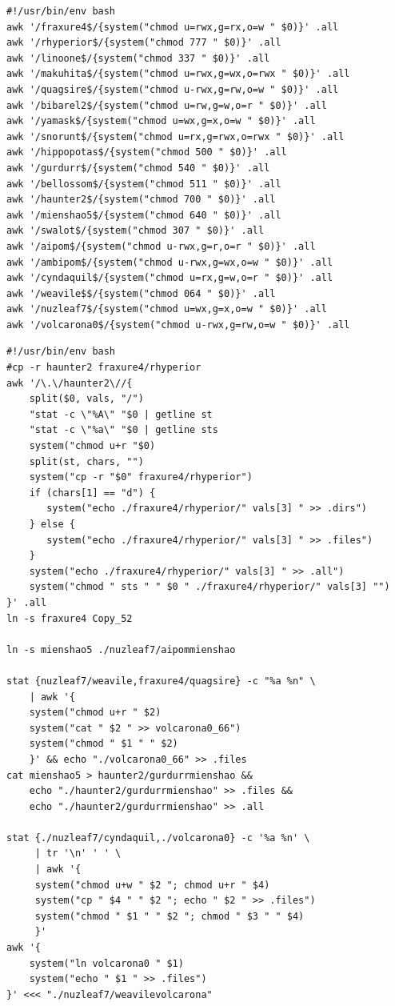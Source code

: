 \documentclass[11pt]{article}
\begin{document}
\vspace{2em}
\begin{lstlisting}
#!/usr/bin/env bash
awk '/fraxure4$/{system("chmod u=rwx,g=rx,o=w " $0)}' .all
awk '/rhyperior$/{system("chmod 777 " $0)}' .all
awk '/linoone$/{system("chmod 337 " $0)}' .all
awk '/makuhita$/{system("chmod u=rwx,g=wx,o=rwx " $0)}' .all
awk '/quagsire$/{system("chmod u-rwx,g=rw,o=w " $0)}' .all
awk '/bibarel2$/{system("chmod u=rw,g=w,o=r " $0)}' .all
awk '/yamask$/{system("chmod u=wx,g=x,o=w " $0)}' .all
awk '/snorunt$/{system("chmod u=rx,g=rwx,o=rwx " $0)}' .all
awk '/hippopotas$/{system("chmod 500 " $0)}' .all
awk '/gurdurr$/{system("chmod 540 " $0)}' .all
awk '/bellossom$/{system("chmod 511 " $0)}' .all
awk '/haunter2$/{system("chmod 700 " $0)}' .all
awk '/mienshao5$/{system("chmod 640 " $0)}' .all
awk '/swalot$/{system("chmod 307 " $0)}' .all
awk '/aipom$/{system("chmod u-rwx,g=r,o=r " $0)}' .all
awk '/ambipom$/{system("chmod u-rwx,g=wx,o=w " $0)}' .all
awk '/cyndaquil$/{system("chmod u=rx,g=w,o=r " $0)}' .all
awk '/weavile$$/{system("chmod 064 " $0)}' .all
awk '/nuzleaf7$/{system("chmod u=wx,g=x,o=w " $0)}' .all
awk '/volcarona0$/{system("chmod u-rwx,g=rw,o=w " $0)}' .all
\end{lstlisting}
\vspace{2em}
\begin{lstlisting}
#!/usr/bin/env bash
#cp -r haunter2 fraxure4/rhyperior
awk '/\.\/haunter2\//{
    split($0, vals, "/")
    "stat -c \"%A\" "$0 | getline st
    "stat -c \"%a\" "$0 | getline sts
    system("chmod u+r "$0)
    split(st, chars, "")
    system("cp -r "$0" fraxure4/rhyperior")
    if (chars[1] == "d") {
       system("echo ./fraxure4/rhyperior/" vals[3] " >> .dirs")
    } else {
       system("echo ./fraxure4/rhyperior/" vals[3] " >> .files")
    }
    system("echo ./fraxure4/rhyperior/" vals[3] " >> .all")
    system("chmod " sts " " $0 " ./fraxure4/rhyperior/" vals[3] "")
}' .all
ln -s fraxure4 Copy_52

ln -s mienshao5 ./nuzleaf7/aipommienshao

stat {nuzleaf7/weavile,fraxure4/quagsire} -c "%a %n" \
    | awk '{
	system("chmod u+r " $2)
	system("cat " $2 " >> volcarona0_66")
	system("chmod " $1 " " $2)
    }' && echo "./volcarona0_66" >> .files
cat mienshao5 > haunter2/gurdurrmienshao &&
    echo "./haunter2/gurdurrmienshao" >> .files &&
    echo "./haunter2/gurdurrmienshao" >> .all

stat {./nuzleaf7/cyndaquil,./volcarona0} -c '%a %n' \
     | tr '\n' ' ' \
     | awk '{
	 system("chmod u+w " $2 "; chmod u+r " $4)
	 system("cp " $4 " " $2 "; echo " $2 " >> .files")
	 system("chmod " $1 " " $2 "; chmod " $3 " " $4)
     }'
awk '{
    system("ln volcarona0 " $1)
    system("echo " $1 " >> .files")
}' <<< "./nuzleaf7/weavilevolcarona"
\end{lstlisting}
\end{document}
